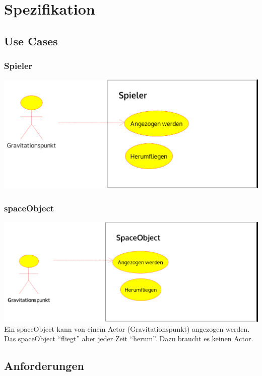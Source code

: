 \documentclass[12pt,a4paper]{scrartcl}
\newcommand{\q}[1]{``#1''}
\begin{document}
\section{Spezifikation}
\subsection{Use Cases}
\subsubsection{Spieler}
\includegraphics[scale=0.2]{use_cases/spieler.png}


\subsubsection{spaceObject}
\includegraphics[scale=0.2]{use_cases/spaceObject.png}\\
Ein spaceObject kann von einem Actor (Gravitationspunkt) angezogen werden. Das spaceObject
\q{fliegt} aber jeder Zeit \q{herum}. Dazu braucht es keinen Actor.


\subsection{Anforderungen} 
\end{document}
